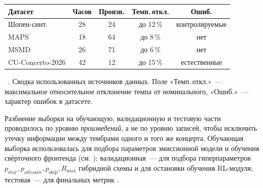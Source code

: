 \par\addvspace{2pt}
{\centering
{}%
\footnotesize
\begin{tabular}{@{}lcccc@{}}
  \toprule
  Датасет & Часов & Произв. & Темп.\,откл. & Ошиб. \\
  \midrule
  Шопен-синт.       & 28 & 24 & до 12\,\%   & контролируемые \\
  MAPS              & 18 & 64 & до 8\,\%    & нет \\
  MSMD              & 26 & 71 & до 6\,\%    & нет \\
  CU-Concerto-2026  & 42 & 12 & до 15\,\%   & естественные \\
  \bottomrule
\end{tabular}\par
\vspace{2pt}
\tablename~\thetable. Сводка использованных источников данных. Поле
«Темп.\,откл.»~--- максимальное относительное отклонение темпа от
номинального, «Ошиб.»~--- характер ошибок в датасете.\par}
\addvspace{4pt}

Разбиение выборки на обучающую, валидационную и тестовую части
проводилось по уровню \textit{произведений}, а не по уровню записей,
чтобы исключить утечку информации между тембрами одного и того же
концерта. Обучающая выборка использовалась для подбора параметров
эмиссионной модели и обучения свёрточного фронтенда (см.
); валидационная~--- для подбора гиперпараметров
$p_{\text{stay}}, p_{\text{advance}}, p_{\text{skip}}, R_{\max}$
гибридной схемы и для остановки обучения RL-модуля; тестовая~--- для
финальных метрик .
